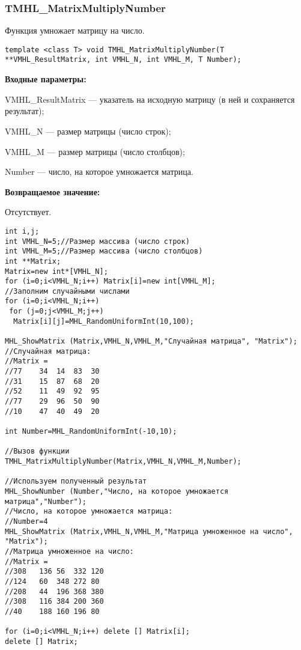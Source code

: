 \documentclass[a4paper,12pt]{article}
\begin{document}
\subsubsection{TMHL\_MatrixMultiplyNumber}\label{TMHL_MatrixMultiplyNumber}

Функция умножает матрицу на число.


\begin{lstlisting}[label=code_syntax_TMHL_MatrixMultiplyNumber,caption=Синтаксис]
template <class T> void TMHL_MatrixMultiplyNumber(T **VMHL_ResultMatrix, int VMHL_N, int VMHL_M, T Number);
\end{lstlisting}

\textbf{Входные параметры:}

 VMHL\_ResultMatrix --- указатель на исходную матрицу (в ней и сохраняется результат);
 
 VMHL\_N --- размер матрицы (число строк);
 
 VMHL\_M --- размер матрицы (число столбцов);
 
 Number --- число, на которое умножается матрица.

\textbf{Возвращаемое значение:}

Отсутствует.


\begin{lstlisting}[label=code_use_TMHL_MatrixMultiplyNumber,caption=Пример использования]
int i,j;
int VMHL_N=5;//Размер массива (число строк)
int VMHL_M=5;//Размер массива (число столбцов)
int **Matrix;
Matrix=new int*[VMHL_N];
for (i=0;i<VMHL_N;i++) Matrix[i]=new int[VMHL_M];
//Заполним случайными числами
for (i=0;i<VMHL_N;i++)
 for (j=0;j<VMHL_M;j++)
  Matrix[i][j]=MHL_RandomUniformInt(10,100);

MHL_ShowMatrix (Matrix,VMHL_N,VMHL_M,"Случайная матрица", "Matrix");
//Случайная матрица:
//Matrix =
//77	34	14	83	30
//31	15	87	68	20
//52	11	49	92	95
//77	29	96	50	90
//10	47	40	49	20

int Number=MHL_RandomUniformInt(-10,10);

//Вызов функции
TMHL_MatrixMultiplyNumber(Matrix,VMHL_N,VMHL_M,Number);

//Используем полученный результат
MHL_ShowNumber (Number,"Число, на которое умножается матрица","Number");
//Число, на которое умножается матрица:
//Number=4
MHL_ShowMatrix (Matrix,VMHL_N,VMHL_M,"Матрица умноженное на число", "Matrix");
//Матрица умноженное на число:
//Matrix =
//308	136	56	332	120
//124	60	348	272	80
//208	44	196	368	380
//308	116	384	200	360
//40	188	160	196	80

for (i=0;i<VMHL_N;i++) delete [] Matrix[i];
delete [] Matrix;
\end{lstlisting}
\end{document}
